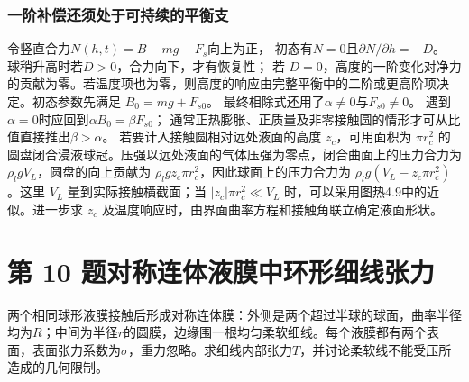 \documentclass[UTF8,fontset=fandol,a4paper,11pt]{ctexart}
\begin{document}
\subsubsection*{一阶补偿还须处于可持续的平衡支}
令竖直合力$N(h,t)=B-mg-F_s$向上为正，
初态有$N=0$且$\partial N/\partial h=-D$。
球稍升高时若$D>0$，合力向下，才有恢复性；
若 $D=0$，高度的一阶变化对净力的贡献为零。若温度项也为零，则高度的响应由完整平衡中的二阶或更高阶项决定。初态参数先满足 $B_0=mg+F_{s0}$。
最终相除式还用了$\alpha\ne0$与$F_{s0}\ne0$。
遇到$\alpha=0$时应回到$\alpha B_0=\beta F_{s0}$；
通常正热膨胀、正质量及非零接触圆的情形才可从比值直接推出$\beta>\alpha$。
若要计入接触圆相对远处液面的高度 $z_c$，可用面积为 $\pi r_c^2$ 的圆盘闭合浸液球冠。压强以远处液面的气体压强为零点，闭合曲面上的压力合力为 $\rho_lgV_L$，圆盘的向上贡献为 $\rho_lg z_c\pi r_c^2$，因此球面上的压力合力为 $\rho_lg(V_L-z_c\pi r_c^2)$。这里 $V_L$ 量到实际接触横截面；当 $|z_c|\pi r_c^2\ll V_L$ 时，可以采用图热4.9中的近似。进一步求 $z_c$ 及温度响应时，由界面曲率方程和接触角联立确定液面形状。




\section*{第 10 题\quad 对称连体液膜中环形细线张力}

两个相同球形液膜接触后形成对称连体膜：外侧是两个超过半球的球面，曲率半径均为$R$；中间为半径$r$的圆膜，边缘围一根均匀柔软细线。每个液膜都有两个表面，表面张力系数为$\sigma$，重力忽略。求细线内部张力$T$，并讨论柔软线不能受压所造成的几何限制。
\end{document}
